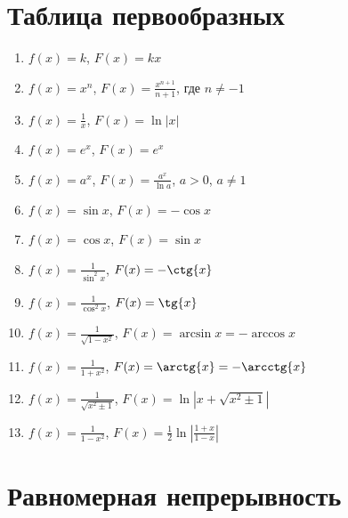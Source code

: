 \documentclass{article}
\begin{document}
	\newpage
		
	\section{Таблица первообразных}
		
		\begin{enumerate}
			
			\item $f(x) = k$, $F(x) = kx$
				
			\item $f(x) = x^n$, $F(x) = \frac{x^{n + 1}}{n + 1}$, где $n \neq -1$
				
			\item $f(x) = \frac{1}{x}$, $F(x) = \ln |x|$
				
			\item $f(x) = e^x$, $F(x) = e^x$
				
			\item $f(x) = a^x$, $F(x) = \frac{a^x}{\ln a}$, $a > 0$, $a \neq 1$
				
			\item $f(x) = \sin{x}$, $F(x) = -\cos{x}$
				
			\item $f(x) = \cos{x}$, $F(x) = \sin{x}$
				
			\item $f(x) = \frac{1}{\sin^2{x}}$, $F(x) = -\ctg{x}$
				
			\item $f(x) = \frac{1}{\cos^2{x}}$, $F(x) = \tg{x}$
				
			\item $f(x) = \frac{1}{\sqrt{1 - x^2}}$, $F(x) = \arcsin{x} = -\arccos{x}$
				
			\item $f(x) = \frac{1}{1 + x^2}$, $F(x) = \arctg{x} = -\arcctg{x}$
			
			\item $f(x) = \frac{1}{\sqrt{x^2 \pm 1}}$, $F(x) = \ln \left| x + \sqrt{x^2 \pm 1} \right|$
			
			\item $f(x) = \frac{1}{1 - x^2}$, $F(x) = \frac{1}{2} \ln{\left| \frac{1+x}{1-x} \right|}$
				
		\end{enumerate}
			
	\newpage
		
	\section{Равномерная непрерывность}
		
\end{document}
